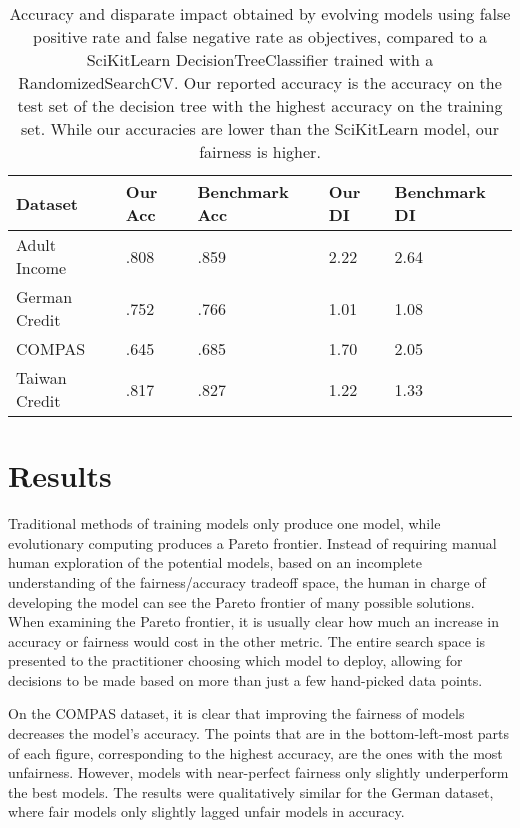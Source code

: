 \documentclass{elsarticle}
\begin{document}
\renewcommand{\arraystretch}{1.5}
\begin{table}
	\begin{center}
	\begin{tabular}{| l | l | l | l | l |}
	\hline Dataset & Our Acc & Benchmark Acc & Our DI & Benchmark DI
	\\ \hline Adult Income  & .808 & .859 & 2.22 & 2.64
	\\ \hline German Credit & .752 & .766 & 1.01 & 1.08
	\\ \hline COMPAS        & .645 & .685 & 1.70 & 2.05
	\\ \hline Taiwan Credit & .817 & .827 & 1.22 & 1.33
	\\ \hline
	\end{tabular}
	\end{center}
	\caption{Accuracy and disparate impact obtained by evolving models using false positive rate and false negative rate as objectives, compared to a SciKitLearn DecisionTreeClassifier trained with a RandomizedSearchCV. Our reported accuracy is the accuracy on the test set of the decision tree with the highest accuracy on the training set. While our accuracies are lower than the SciKitLearn model, our fairness is higher.}
\end{table}

\section{Results}	
Traditional methods of training models only produce one model, while evolutionary computing produces a Pareto frontier.  Instead of requiring manual human exploration of the potential models, based on an incomplete understanding of the fairness/accuracy tradeoff space, the human in charge of developing the model can see the Pareto frontier of many possible solutions. When examining the Pareto frontier, it is usually clear how much an increase in accuracy or fairness would cost in the other metric. The entire search space is presented to the practitioner choosing which model to deploy, allowing for decisions to be made based on more than just a few hand-picked data points.

On the COMPAS dataset, it is clear that improving the fairness of models decreases the model’s accuracy. The points that are in the bottom-left-most parts of each figure, corresponding to the highest accuracy, are the ones with the most unfairness. However, models with near-perfect fairness only slightly underperform the best models. The results were qualitatively similar for the German dataset, where fair models only slightly lagged unfair models in accuracy. 
\end{document}
